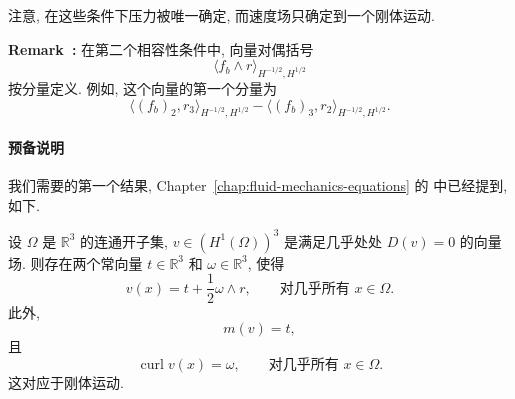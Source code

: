 注意, 在这些条件下压力被唯一确定, 而速度场只确定到一个刚体运动.

\par\noindent{}\textbf{Remark~\thechapterfoursectionsevenremark:}\label{rem:chap4-stress-vector-duality}\quad
在第二个相容性条件中, 向量对偶括号
\[
 \langle f_b\wedge r\rangle_{H^{-1/2},H^{1/2}}
\]
按分量定义. 例如, 这个向量的第一个分量为
\[
 \langle(f_b)_2,r_3\rangle_{H^{-1/2},H^{1/2}}
 -\langle(f_b)_3,r_2\rangle_{H^{-1/2},H^{1/2}}.
\]

\paragraph{预备说明}
\label{subsubsec:chap4-stress-preliminaries}

我们需要的第一个结果, Chapter~\ref{chap:fluid-mechanics-equations} 的 中已经提到, 如下.

\begin{Lemma}
\label{lem:chap4-zero-deformation-rigid-motion}
设 $\Omega$ 是 $\mathbb R^3$ 的连通开子集, $v\in(H^1(\Omega))^3$ 是满足几乎处处 $D(v)=0$ 的向量场. 则存在两个常向量 $t\in\mathbb R^3$ 和 $\omega\in\mathbb R^3$, 使得
\[
 v(x)=t+\frac12\omega\wedge r,
 \qquad\text{对几乎所有 }x\in\Omega.
\]
此外,
\[
 m(v)=t,
\]
且
\[
 \operatorname{curl}v(x)=\omega,
 \qquad\text{对几乎所有 }x\in\Omega.
\]
这对应于刚体运动.
\end{Lemma}

